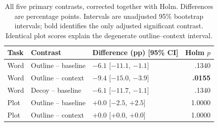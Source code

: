 \begin{table}[htbp]
\centering\small
\begin{tabular}{@{}lll r@{}}
\toprule
Task & Contrast & Difference (pp) [95\% CI] & Holm $p$ \\
\midrule
Word & Outline -- baseline & $-6.1$ [$-11.1$, $-1.1$] & .1340 \\
Word & Outline -- context & $\mathbf{-9.4}$ [$-15.0$, $-3.9$] & \textbf{.0155} \\
Word & Decoy -- baseline & $-6.1$ [$-11.7$, $-1.1$] & .1340 \\
Plot & Outline -- baseline & $+0.0$ [$-2.5$, $+2.5$] & 1.0000 \\
Plot & Outline -- context & $+0.0$ [$+0.0$, $+0.0$] & 1.0000 \\
\bottomrule
\end{tabular}
\caption{All five primary contrasts, corrected together with Holm. Differences are percentage points. Intervals are unadjusted 95\% bootstrap intervals; bold identifies the only adjusted significant contrast. Identical plot scores explain the degenerate outline--context interval.}
\label{tab:contrasts}
\end{table}
